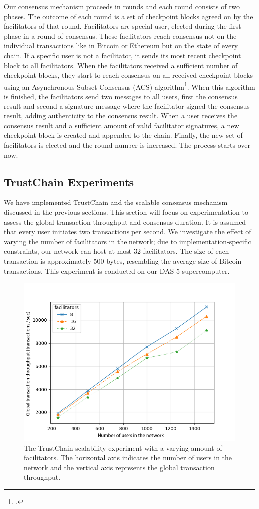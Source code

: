 \documentclass[USenglish]{article}
\begin{document}
Our consensus mechanism proceeds in rounds and each round consists of two phases.
The outcome of each round is a set of checkpoint blocks agreed on by the facilitators of that round.
Facilitators are special user, elected during the first phase in a round of consensus.
These facilitators reach consensus not on the individual transactions like in Bitcoin or Ethereum but on the state of every chain.
If a specific user is not a facilitator, it sends its most recent checkpoint block to all facilitators.
When the facilitators received a sufficient number of checkpoint blocks, they start to reach consensus on all received checkpoint blocks using an Asynchronous Subset Consensus (ACS) algorithm\footcite{miller2016honey}.
When this algorithm is finished, the facilitators send two messages to all users, first the consensus result and second a signature message where the facilitator signed the consensus result, adding authenticity to the consensus result.
When a user receives the consensus result and a sufficient amount of valid facilitator signatures, a new checkpoint block is created and appended to the chain.
Finally, the new set of facilitators is elected and the round number is increased.
The process starts over now.

\subsection{TrustChain Experiments}
\label{sec:trustchain_experiments}
We have implemented TrustChain and the scalable consensus mechanism discussed in the previous sections.
This section will focus on experimentation to assess the global transaction throughput and consensus duration.
It is assumed that every user initiates two transactions per second.
We investigate the effect of varying the number of facilitators in the network; due to implementation-specific constraints, our network can host at most 32 facilitators.
The size of each transaction is approximately 500 bytes, resembling the average size of Bitcoin transactions.
This experiment is conducted on our DAS-5 supercomputer.

\begin{figure}[t]
	\centering
	\includegraphics[width=0.7\columnwidth]{assets/trustchain_scalability}
	\caption{The TrustChain scalability experiment with a varying amount of facilitators. The horizontal axis indicates the number of users in the network and the vertical axis represents the global transaction throughput.}
	\label{fig:trustchain_scalability_experiment}
\end{figure}
\end{document}
